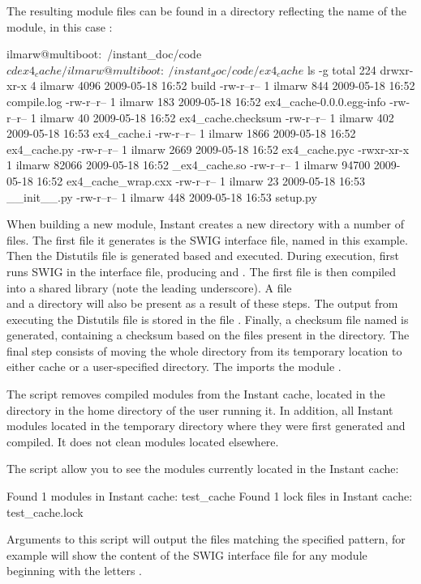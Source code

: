 The resulting module files can be found in a directory reflecting the name of
the module, in this case :
\footnotesize
\begin{code}
ilmarw@multiboot:~/instant_doc/code$ cd ex4_cache/
ilmarw@multiboot:~/instant_doc/code/ex4_cache$ ls -g
total 224
drwxr-xr-x 4 ilmarw  4096 2009-05-18 16:52 build
-rw-r--r-- 1 ilmarw   844 2009-05-18 16:52 compile.log
-rw-r--r-- 1 ilmarw   183 2009-05-18 16:52 ex4_cache-0.0.0.egg-info
-rw-r--r-- 1 ilmarw    40 2009-05-18 16:52 ex4_cache.checksum
-rw-r--r-- 1 ilmarw   402 2009-05-18 16:53 ex4_cache.i
-rw-r--r-- 1 ilmarw  1866 2009-05-18 16:52 ex4_cache.py
-rw-r--r-- 1 ilmarw  2669 2009-05-18 16:52 ex4_cache.pyc
-rwxr-xr-x 1 ilmarw 82066 2009-05-18 16:52 _ex4_cache.so
-rw-r--r-- 1 ilmarw 94700 2009-05-18 16:52 ex4_cache_wrap.cxx
-rw-r--r-- 1 ilmarw    23 2009-05-18 16:53 __init__.py
-rw-r--r-- 1 ilmarw   448 2009-05-18 16:53 setup.py
\end{code}
\normalsize
When building a new module, Instant creates a new directory with 
a number of files. The first file it generates is the SWIG interface file, named
 in this example. Then the Distutils file  is generated based
and executed. During execution,  first runs SWIG in the interface file, 
producing  and . The first file
is then compiled into a shared library  
(note the leading underscore). A file \\
and a directory  will also be present as a result of these
steps. The output from executing the Distutils file is stored in the file
.  Finally, a checksum file named
 is generated, containing a checksum based on
the files present in the directory. The final step consists of moving the whole
directory from its temporary location to either cache or a user-specified
directory. The  imports the module . 


The script  removes
compiled modules from the Instant cache, located in the directory
 in the home directory of the user running it. In addition, all
Instant modules located in the temporary directory where they were first
generated and compiled. It does not clean modules located elsewhere.

The script  allow you to see the modules currently located in the
Instant cache:
\begin{code}
Found 1 modules in Instant cache:
test_cache
Found 1 lock files in Instant cache:
test_cache.lock
\end{code}
Arguments to this script will output the files matching the specified pattern,
for example will  show the content of the
SWIG interface file for any module beginning with the letters .

